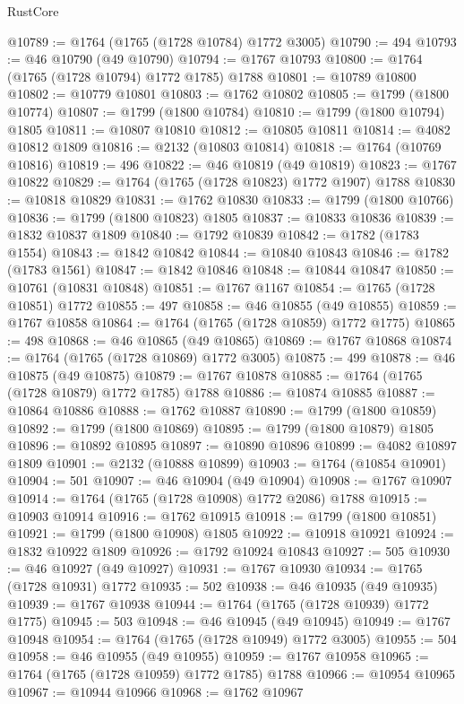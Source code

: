 \begin{lexlean}{RustCore}
\begin{coremodule}
@10789 := @1764 (@1765 (@1728 @10784) @1772 @3005)
@10790 := 494
@10793 := @46 @10790 (@49 @10790)
@10794 := @1767 @10793
@10800 := @1764 (@1765 (@1728 @10794) @1772 @1785) @1788
@10801 := @10789 @10800
@10802 := @10779 @10801
@10803 := @1762 @10802
@10805 := @1799 (@1800 @10774)
@10807 := @1799 (@1800 @10784)
@10810 := @1799 (@1800 @10794) @1805
@10811 := @10807 @10810
@10812 := @10805 @10811
@10814 := @4082 @10812 @1809
@10816 := @2132 (@10803 @10814)
@10818 := @1764 (@10769 @10816)
@10819 := 496
@10822 := @46 @10819 (@49 @10819)
@10823 := @1767 @10822
@10829 := @1764 (@1765 (@1728 @10823) @1772 @1907) @1788
@10830 := @10818 @10829
@10831 := @1762 @10830
@10833 := @1799 (@1800 @10766)
@10836 := @1799 (@1800 @10823) @1805
@10837 := @10833 @10836
@10839 := @1832 @10837 @1809
@10840 := @1792 @10839
@10842 := @1782 (@1783 @1554)
@10843 := @1842 @10842
@10844 := @10840 @10843
@10846 := @1782 (@1783 @1561)
@10847 := @1842 @10846
@10848 := @10844 @10847
@10850 := @10761 (@10831 @10848)
@10851 := @1767 @1167
@10854 := @1765 (@1728 @10851) @1772
@10855 := 497
@10858 := @46 @10855 (@49 @10855)
@10859 := @1767 @10858
@10864 := @1764 (@1765 (@1728 @10859) @1772 @1775)
@10865 := 498
@10868 := @46 @10865 (@49 @10865)
@10869 := @1767 @10868
@10874 := @1764 (@1765 (@1728 @10869) @1772 @3005)
@10875 := 499
@10878 := @46 @10875 (@49 @10875)
@10879 := @1767 @10878
@10885 := @1764 (@1765 (@1728 @10879) @1772 @1785) @1788
@10886 := @10874 @10885
@10887 := @10864 @10886
@10888 := @1762 @10887
@10890 := @1799 (@1800 @10859)
@10892 := @1799 (@1800 @10869)
@10895 := @1799 (@1800 @10879) @1805
@10896 := @10892 @10895
@10897 := @10890 @10896
@10899 := @4082 @10897 @1809
@10901 := @2132 (@10888 @10899)
@10903 := @1764 (@10854 @10901)
@10904 := 501
@10907 := @46 @10904 (@49 @10904)
@10908 := @1767 @10907
@10914 := @1764 (@1765 (@1728 @10908) @1772 @2086) @1788
@10915 := @10903 @10914
@10916 := @1762 @10915
@10918 := @1799 (@1800 @10851)
@10921 := @1799 (@1800 @10908) @1805
@10922 := @10918 @10921
@10924 := @1832 @10922 @1809
@10926 := @1792 @10924 @10843
@10927 := 505
@10930 := @46 @10927 (@49 @10927)
@10931 := @1767 @10930
@10934 := @1765 (@1728 @10931) @1772
@10935 := 502
@10938 := @46 @10935 (@49 @10935)
@10939 := @1767 @10938
@10944 := @1764 (@1765 (@1728 @10939) @1772 @1775)
@10945 := 503
@10948 := @46 @10945 (@49 @10945)
@10949 := @1767 @10948
@10954 := @1764 (@1765 (@1728 @10949) @1772 @3005)
@10955 := 504
@10958 := @46 @10955 (@49 @10955)
@10959 := @1767 @10958
@10965 := @1764 (@1765 (@1728 @10959) @1772 @1785) @1788
@10966 := @10954 @10965
@10967 := @10944 @10966
@10968 := @1762 @10967

\end{coremodule}
\end{lexlean}
